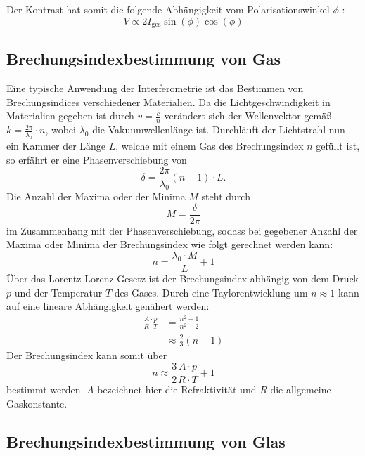 \noindent Der Kontrast hat somit die folgende Abhängigkeit vom Polarisationswinkel $\phi$ :
\begin{equation}
    V \propto 2 I_{\text{ges}} \sin(\phi)\cos(\phi) \label{eqn:kontrastphi}
\end{equation}


\subsection{Brechungsindexbestimmung von Gas}

\noindent Eine typische Anwendung der Interferometrie ist das Bestimmen von Brechungsindices verschiedener Materialien. Da die Lichtgeschwindigkeit in Materialien gegeben ist durch
$ v = \frac{c}{n}$ verändert sich der Wellenvektor gemäß $ k = \frac{2 \pi}{\lambda_0} \cdot n$, wobei $\lambda_0$ die Vakuumwellenlänge ist. 
Durchläuft der Lichtstrahl nun ein Kammer der Länge $L$, welche mit einem Gas des Brechungsindex $n$ gefüllt ist, so erfährt er eine Phasenverschiebung von 
\begin{equation*}
    \delta = \frac{2 \pi}{\lambda_0} \left(n-1\right) \cdot L.
\end{equation*}
Die Anzahl der Maxima oder der Minima $M$ steht durch 
\begin{equation*}
    M = \frac{\delta}{2 \pi}
\end{equation*}
im Zusammenhang mit der Phasenverschiebung, sodass bei gegebener Anzahl der Maxima oder Minima der Brechungsindex wie folgt gerechnet werden kann:
\begin{equation}
    n = \frac{\lambda_0\cdot M}{L} + 1
    \label{eqn:n_Luft}
\end{equation}
\noindent Über das Lorentz-Lorenz-Gesetz ist der Brechungsindex abhängig von dem Druck $p$ und der Temperatur $T$ des Gases. Durch eine Taylorentwicklung um $n \approx 1$ kann auf eine 
lineare Abhängigkeit genähert werden:
\begin{align*}
    \frac{A \cdot p}{R \cdot T} &= \frac{n^2 - 1}{n^2 + 2} \\
    &\approx \frac{2}{3}\left( n - 1 \right) 
\end{align*}
Der Brechungsindex kann somit über 
\begin{equation}
    n \approx \frac{3}{2} \frac{A \cdot p}{R \cdot T} + 1
    \label{eqn:Lorentz_Lorenz}
\end{equation}
bestimmt werden. $A$ bezeichnet hier die Refraktivität und $R$ die allgemeine Gaskonstante.


\subsection{Brechungsindexbestimmung von Glas}

